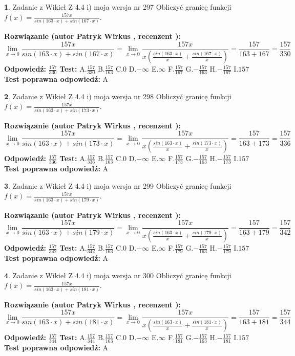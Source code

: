 \documentclass[12pt, a4paper]{article}
\theoremstyle{definition} %
\newtheorem{zad}{}
\newcommand{\zadStart}[1]{\begin{zad}#1\newline}
\newcommand{\zadStop}{\end{zad}}
\newcommand{\rozwStart}[2]{\noindent \textbf{Rozwiązanie (autor #1 , recenzent #2): }\newline}
\newcommand{\rozwStop}{\newline}
\newcommand{\odpStart}{\noindent \textbf{Odpowiedź:}\newline}
\newcommand{\odpStop}{\newline}
\newcommand{\testStart}{\noindent \textbf{Test:}\newline}
\newcommand{\testStop}{\newline}
\newcommand{\kluczStart}{\noindent \textbf{Test poprawna odpowiedź:}\newline}
\newcommand{\kluczStop}{\newline}
\begin{document}
\zadStart{Zadanie z Wikieł Z 4.4 i) moja wersja nr 297}
Obliczyć granicę funkcji $f(x)=\frac{157x}{sin(163\cdot x) +sin(167\cdot x)}$.
\zadStop
\rozwStart{Patryk Wirkus}{}
$$\lim\limits_{x\to 0}\frac{157x}{sin(163\cdot x) +sin(167\cdot x)}=\lim\limits_{x\to 0}\frac{157x}{x(\frac{sin(163\cdot x)}{x}+\frac{sin(167\cdot x)}{x})}=\frac{157}{163+167} = \frac{157}{330}$$
\rozwStop
\odpStart
$\frac{157}{330}$
\odpStop
\testStart
A.$\frac{157}{330}$
B.$\frac{157}{163}$
C.$0$
D.$-\infty$
E.$\infty$
F.$\frac{157}{167}$
G.$-\frac{157}{163}$
H.$-\frac{157}{167}$
I.$157$
\testStop
\kluczStart
A
\kluczStop



\zadStart{Zadanie z Wikieł Z 4.4 i) moja wersja nr 298}
Obliczyć granicę funkcji $f(x)=\frac{157x}{sin(163\cdot x) +sin(173\cdot x)}$.
\zadStop
\rozwStart{Patryk Wirkus}{}
$$\lim\limits_{x\to 0}\frac{157x}{sin(163\cdot x) +sin(173\cdot x)}=\lim\limits_{x\to 0}\frac{157x}{x(\frac{sin(163\cdot x)}{x}+\frac{sin(173\cdot x)}{x})}=\frac{157}{163+173} = \frac{157}{336}$$
\rozwStop
\odpStart
$\frac{157}{336}$
\odpStop
\testStart
A.$\frac{157}{336}$
B.$\frac{157}{163}$
C.$0$
D.$-\infty$
E.$\infty$
F.$\frac{157}{173}$
G.$-\frac{157}{163}$
H.$-\frac{157}{173}$
I.$157$
\testStop
\kluczStart
A
\kluczStop



\zadStart{Zadanie z Wikieł Z 4.4 i) moja wersja nr 299}
Obliczyć granicę funkcji $f(x)=\frac{157x}{sin(163\cdot x) +sin(179\cdot x)}$.
\zadStop
\rozwStart{Patryk Wirkus}{}
$$\lim\limits_{x\to 0}\frac{157x}{sin(163\cdot x) +sin(179\cdot x)}=\lim\limits_{x\to 0}\frac{157x}{x(\frac{sin(163\cdot x)}{x}+\frac{sin(179\cdot x)}{x})}=\frac{157}{163+179} = \frac{157}{342}$$
\rozwStop
\odpStart
$\frac{157}{342}$
\odpStop
\testStart
A.$\frac{157}{342}$
B.$\frac{157}{163}$
C.$0$
D.$-\infty$
E.$\infty$
F.$\frac{157}{179}$
G.$-\frac{157}{163}$
H.$-\frac{157}{179}$
I.$157$
\testStop
\kluczStart
A
\kluczStop



\zadStart{Zadanie z Wikieł Z 4.4 i) moja wersja nr 300}
Obliczyć granicę funkcji $f(x)=\frac{157x}{sin(163\cdot x) +sin(181\cdot x)}$.
\zadStop
\rozwStart{Patryk Wirkus}{}
$$\lim\limits_{x\to 0}\frac{157x}{sin(163\cdot x) +sin(181\cdot x)}=\lim\limits_{x\to 0}\frac{157x}{x(\frac{sin(163\cdot x)}{x}+\frac{sin(181\cdot x)}{x})}=\frac{157}{163+181} = \frac{157}{344}$$
\rozwStop
\odpStart
$\frac{157}{344}$
\odpStop
\testStart
A.$\frac{157}{344}$
B.$\frac{157}{163}$
C.$0$
D.$-\infty$
E.$\infty$
F.$\frac{157}{181}$
G.$-\frac{157}{163}$
H.$-\frac{157}{181}$
I.$157$
\testStop
\kluczStart
A
\kluczStop
\end{document}
